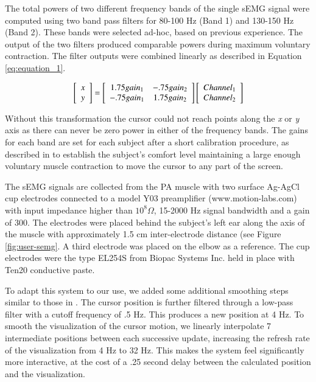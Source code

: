 The total powers of two different frequency bands of the single sEMG signal were computed using two band pass filters for 80-100 Hz (Band 1) and 130-150 Hz (Band 2). These bands were selected ad-hoc, based on previous experience. The output of the two filters produced comparable powers during maximum voluntary contraction. The filter outputs were combined linearly as described in Equation \ref{eq:equation_1}. 


\begin{equation}
\centering
\left[ \begin{array}{c} x\\ y \end{array} \right] = \left[\begin{array}{c c} 1.75 gain_1 & -.75 gain_2 \\ -.75gain_{1} &  1.75gain_{2}\end{array} \right]\left[\begin{array}{c}Channel_1 \\ Channel_2\end{array}\right]
	\label{eq:equation_1}
\end{equation}


Without this transformation the cursor could not reach points along the \emph{x} or \emph{y} axis as there can never be zero power in either of the frequency bands. The gains for each band are set for each subject after a short calibration procedure, as described in \cite{JoshiTwoDimCursor} to establish the subject’s comfort level maintaining a large enough voluntary muscle contraction to move the cursor to any part of the screen.

The sEMG signals are collected from the PA muscle with two surface Ag-AgCl cup electrodes connected to a model Y03 preamplifier (www.motion-labs.com) with input impedance higher than $10^{8} \Omega$, 15-2000 Hz signal bandwidth and a gain of 300. The electrodes were placed behind the subject’s left ear along the axis of the muscle with approximately 1.5 cm inter-electrode distance (see Figure \ref{fig:user-semg}. A third electrode was placed on the elbow as a reference. The cup electrodes were the type EL254S from Biopac Systems Inc. held in place with Ten20 conductive paste. 

To adapt this system to our use, we added some additional smoothing steps similar to those in \cite{vernon2011}. The cursor position is further filtered through a low-pass filter with a cutoff frequency of .5 Hz. This produces a new position at 4 Hz. To smooth the visualization of the cursor motion, we linearly interpolate 7 intermediate positions between each successive update, increasing the refresh rate of the visualization from 4 Hz to 32 Hz. This makes the system feel significantly more interactive, at the cost of a .25 second delay between the calculated position and the visualization.

